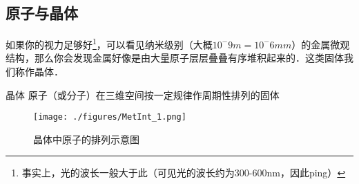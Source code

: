 
\subsection{原子与晶体}
如果你的视力足够好\footnote{事实上，光的波长一般大于此（可见光的波长约为300-600nm，因此ping）}，可以看见纳米级别（大概$10^-9m =10^-6 mm$）的金属微观结构，那么你会发现金属好像是由大量原子层层叠叠有序堆积起来的．这类固体我们称作晶体．

\begin{definition}{晶体}
原子（或分子）在三维空间按一定规律作周期性排列的固体
\end{definition}

\begin{figure}[ht]
\centering
\texttt{[image: ./figures/MetInt\_1.png]}
\caption{晶体中原子的排列示意图} \label{MetInt_fig1}
\end{figure}